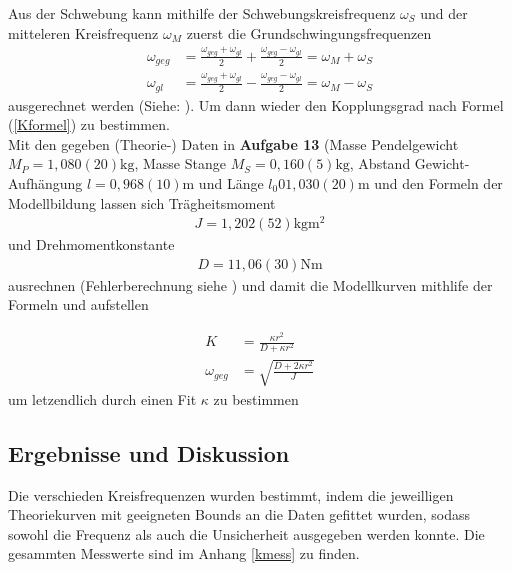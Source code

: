 \documentclass[11pt, a4paper]{article}
\begin{document}
    Aus der Schwebung kann mithilfe der Schwebungskreisfrequenz $\omega_S$
    und der mitteleren Kreisfrequenz  $\omega_M$ zuerst die Grundschwingungsfrequenzen
    \begin{align}
        \omega_{geg} &= \frac{\omega_{geg} + \omega_{gl}}{2} + \frac{\omega_{geg} - \omega_{gl}}{2} = \omega_M + \omega_S \\
        \omega_{gl} &= \frac{\omega_{geg} + \omega_{gl}}{2} - \frac{\omega_{geg} - \omega_{gl}}{2} = \omega_M - \omega_S
    \end{align}
    ausgerechnet werden (Siehe: \cite[Formel (34)]{pen}). Um dann wieder den Kopplungsgrad nach Formel (\ref{Kformel})
    zu bestimmen. \\
    Mit den gegeben (Theorie-) Daten in \textbf{Aufgabe 13} \cite{pen} (Masse Pendelgewicht $M_P = 1,080(20)\si{\kilogram}$,
    Masse Stange $M_S = 0,160(5)\si{\kilogram}$, Abstand Gewicht-Aufhängung $l = 0,968(10)\si{\metre}$ und Länge $l_0 0 1,030(20)\si{\metre}$
    und den Formeln der Modellbildung \cite{modell}
    lassen sich Trägheitsmoment
    \begin{align}
        J = 1,202(52)\si{\kilogram\metre\squared} \label{J}
    \end{align}
    und Drehmomentkonstante
    \begin{align}
        D = 11,06(30)\si{\newton\metre} \label{D}
    \end{align} 
    ausrechnen (Fehlerberechnung siehe \cite[Formel (19)]{ABW}) und damit die Modellkurven
    mithlife der Formeln \cite[(30)]{pen} und \cite[(35)]{pen}
    aufstellen
    
    \begin{align}
        K &= \frac{\kappa r^2}{D + \kappa r^2} \label{Kkappa} \\
        \omega_{geg} &= \sqrt{\frac{D+2\kappa r^2}{J}} \label{Okappa}
    \end{align}
    um letzendlich durch einen Fit  $\kappa$ zu bestimmen

    \subsection{Ergebnisse und Diskussion}

    Die verschieden Kreisfrequenzen wurden bestimmt, indem die jeweilligen Theoriekurven mit geeigneten
    Bounds an die Daten gefittet wurden, sodass sowohl die Frequenz als auch die Unsicherheit ausgegeben
    werden konnte. Die gesammten Messwerte sind im Anhang \ref{kmess} zu finden.
\end{document}
